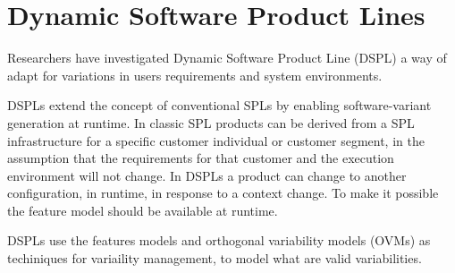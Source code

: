 \section{Dynamic Software Product Lines}
Researchers have investigated Dynamic Software Product Line (DSPL) a way of adapt for variations in users requirements and system environments.

DSPLs extend the concept of conventional SPLs by enabling software-variant generation at runtime. In classic SPL products can be derived from a SPL infrastructure for a specific customer individual or customer segment, in the assumption that the requirements for that customer and the execution environment will not change. In DSPLs a product can change to another configuration, in runtime, in response to a context change. To make it possible the feature model should be available at runtime. \cite{bencomo_view_2012}

DSPLs use the features models and  orthogonal variability models (OVMs) as techiniques for variaility management, to model what are valid variabilities.
